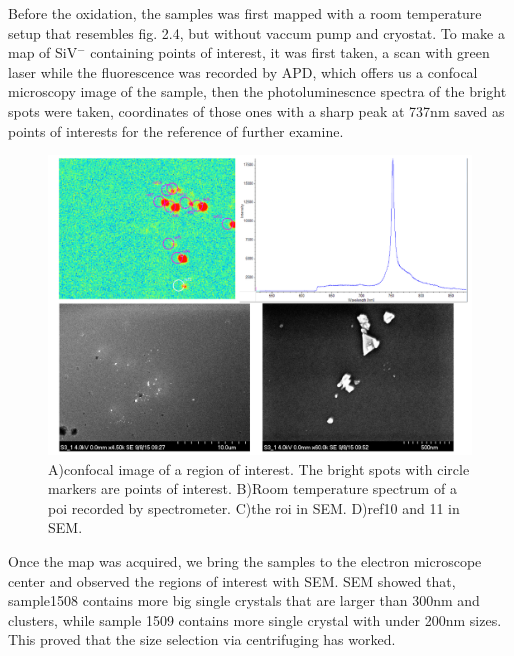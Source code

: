 Before the oxidation, the samples was first mapped with a room temperature setup that resembles fig. 2.4, but without vaccum pump and cryostat. To make a map of SiV$^{-}$ containing points of interest, it was first taken, a scan with green laser while the fluorescence was recorded by APD, which offers us a confocal microscopy image of the sample, then the photoluminescnce spectra of the bright spots were taken, coordinates of those ones with a sharp peak at 737nm saved as points of interests for the reference of further examine.

\begin{figure}[h]
\centering
\includegraphics[width=1\linewidth]{Figures/pic/RTPL}
\caption{A)confocal image of a region of interest. The bright spots with circle markers are points of interest. B)Room temperature spectrum of a poi recorded by spectrometer. C)the roi in SEM. D)ref10 and 11 in SEM.}
\label{fig:2015-09-07-ow-capture-20150907151210-744-1}
\end{figure}

Once the map was acquired, we bring the samples to the electron microscope center and observed the regions of interest with SEM. SEM showed that, sample1508 contains more big single crystals that are larger than 300nm and clusters, while sample 1509 contains more single crystal with under 200nm sizes. This proved that the size selection via centrifuging has worked.
 
